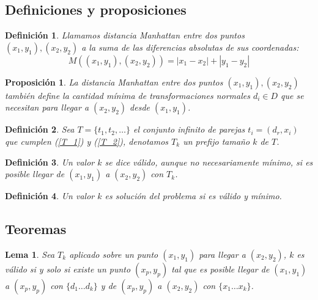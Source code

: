 \documentclass{article}
\theoremstyle{default}
\newtheorem*{lemma}{Lema}
\newtheorem*{proposition}{Proposición}
\newtheorem*{definition}{Definición}
\begin{document}
\subsection{Definiciones y proposiciones}
	\begin{definition}
		Llamamos distancia \textit{Manhattan} entre dos puntos $(x_1,y_1), (x_2,y_2)$ a la suma de las diferencias absolutas de sus coordenadas:
		\begin{equation*}
			M((x_1,y_1),(x_2,y_2)) = |x_1 - x_2| + |y_1 - y_2|
		\end{equation*}
	\end{definition}
	\begin{proposition}
		La distancia \textit{Manhattan} entre dos puntos $(x_1,y_1), (x_2,y_2)$ también define la cantidad mínima de transformaciones normales $d_i \in D$ que se necesitan para llegar a $(x_2,y_2)$ desde $(x_1,y_1)$.
	\end{proposition}
	\begin{definition}
		Sea $T = \{t_1, t_2, \dots \}$ el conjunto infinito de parejas $t_i = (d_r, x_i)$ que cumplen (\ref{T_1}) y (\ref{T_2}), denotamos $T_k$ un prefijo tamaño $k$ de $T$.
	\end{definition}
	\begin{definition}
		Un valor $k$ se dice válido, aunque no necesariamente mínimo, si es posible llegar de $(x_1, y_1)$ a $(x_2, y_2)$ con $T_k$.
	\end{definition}
	\begin{definition}
		Un valor $k$ es solución del problema si es válido y mínimo.
	\end{definition}
%
%
\subsection{Teoremas}
	\begin{lemma}
		Sea $T_k$ aplicado sobre un punto $(x_1,y_1)$ para llegar a $(x_2,y_2)$, $k$ es válido si y solo si existe un punto $(x_p, y_p)$ tal que es posible llegar de $(x_1,y_1)$ a $(x_p, y_p)$ con $\{d_1 \dots d_k\}$ y de $(x_p, y_p)$ a $(x_2, y_2)$ con $\{x_1 \dots x_k\}$.
	\end{lemma}
\end{document}
